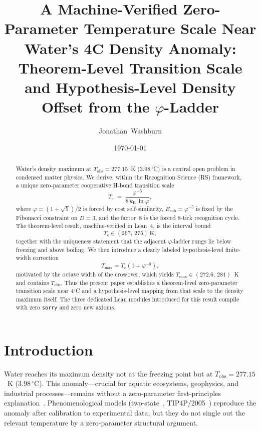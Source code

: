 \documentclass[aps,prl,twocolumn,superscriptaddress,showpacs,floatfix]{revtex4-2}
\newcommand{\Ecoh}{E_{\mathrm{coh}}}
\newcommand{\kB}{k_{\mathrm{B}}}
\newcommand{\Tc}{T_{\mathrm{c}}}
\newcommand{\Tobs}{T_{\mathrm{obs}}}
\newcommand{\Tmax}{T_{\mathrm{max}}}
\newcommand{\phig}{\varphi}
\begin{document}
\title{A Machine-Verified Zero-Parameter Temperature Scale Near Water's 4\textdegree C Density Anomaly:\\
Theorem-Level Transition Scale and Hypothesis-Level Density Offset from the \texorpdfstring{$\varphi$}{phi}-Ladder}

\author{Jonathan~Washburn}

\date{\today}

\begin{abstract}
Water's density maximum at $\Tobs = 277.15$~K ($3.98\,{}^{\circ}$C) is a central open problem in condensed matter physics.
We derive, within the Recognition Science (RS) framework, a unique zero-parameter cooperative H-bond transition scale
\[
  \Tc \;=\; \frac{\phig^{-5}}{8\,\kB\,\ln\phig},
\]
where $\phig = (1+\sqrt5)/2$ is forced by cost self-similarity, $\Ecoh = \phig^{-5}$ is fixed by the Fibonacci constraint on $D=3$, and the factor~8 is the forced 8-tick recognition cycle.
The theorem-level result, machine-verified in Lean~4, is the interval bound
\[
  \Tc \in (267,\,275)\ \mathrm{K},
\]
together with the uniqueness statement that the adjacent $\phig$-ladder rungs lie below freezing and above boiling.
We then introduce a clearly labeled hypothesis-level finite-width correction
\[
  \Tmax = \Tc(1+\phig^{-8}),
\]
motivated by the octave width of the crossover, which yields $\Tmax \in (272.6,\,281)$~K and contains $\Tobs$.
Thus the present paper establishes a theorem-level zero-parameter transition scale near 4$^\circ$C and a hypothesis-level mapping from that scale to the density maximum itself.
The three dedicated Lean modules introduced for this result compile with zero \texttt{sorry} and zero new axioms.
\end{abstract}

\maketitle

\section{Introduction}

Water reaches its maximum density not at the freezing point but at $\Tobs = 277.15$~K ($3.98\,{}^{\circ}$C).
This anomaly---crucial for aquatic ecosystems, geophysics, and industrial processes---remains without a zero-parameter first-principles explanation~\cite{Debenedetti2001,Russo2014}.
Phenomenological models (two-state~\cite{Poole1992}, TIP4P/2005~\cite{Abascal2005}) reproduce the anomaly after calibration to experimental data, but they do not single out the relevant temperature by a zero-parameter structural argument.
\end{document}
